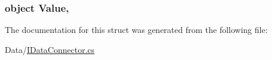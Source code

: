 \subsubsection[{Value}]{\setlength{\rightskip}{0pt plus 5cm}object Value\hspace{0.3cm}{\ttfamily [get]}, {\ttfamily [set]}}\label{structOTA_1_1Data_1_1WhereFilter_a2d7e8cd2081ad3db5aa8e597557123e9}


The documentation for this struct was generated from the following file\+:\begin{DoxyCompactItemize}
\item 
Data/\hyperlink{IDataConnector_8cs}{I\+Data\+Connector.\+cs}\end{DoxyCompactItemize}
